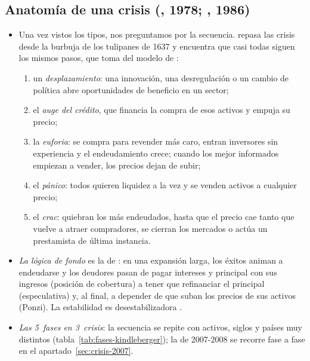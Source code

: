 \documentclass[11pt]{article}
\begin{document}
\subsection{Anatomía de una crisis (, 1978; , 1986)}\label{sec:anatomia}

\begin{itemize}
\item Una vez vistos los tipos, nos preguntamos por la secuencia. \textcite{Kindleberger1978Manias} repasa las crisis desde la burbuja de los tulipanes de 1637 y encuentra que casi todas siguen los mismos pasos, que toma del modelo de :
  \begin{enumerate}
  \item un \emph{desplazamiento}: una innovación, una desregulación o un cambio de política abre oportunidades de beneficio en un sector;
  \item el \emph{auge del crédito}, que financia la compra de esos activos y empuja su precio;
  \item la \emph{euforia}: se compra para revender más caro, entran inversores sin experiencia y el endeudamiento crece; cuando los mejor informados empiezan a vender, los precios dejan de subir;
  \item el \emph{pánico}: todos quieren liquidez a la vez y se venden activos a cualquier precio;
  \item el \emph{crac}: quiebran los más endeudados, hasta que el precio cae tanto que vuelve a atraer compradores, se cierran los mercados o actúa un prestamista de última instancia.
  \end{enumerate}
\item \emph{La lógica de fondo} es la  de : en una expansión larga, los éxitos animan a endeudarse y los deudores pasan de pagar intereses y principal con sus ingresos (posición de cobertura) a tener que refinanciar el principal (especulativa) y, al final, a depender de que suban los precios de sus activos (Ponzi). La estabilidad es desestabilizadora\nocite{Minsky1986Stabilizing,Minsky1992Financial}  .
\item \emph{Las 5~fases en 3~crisis}: la secuencia se repite con activos, siglos y países muy distintos (tabla~\ref{tab:fases-kindleberger}); la de 2007-2008 se recorre fase a fase en el apartado~\ref{sec:crisis-2007}.
\end{itemize}
\end{document}
